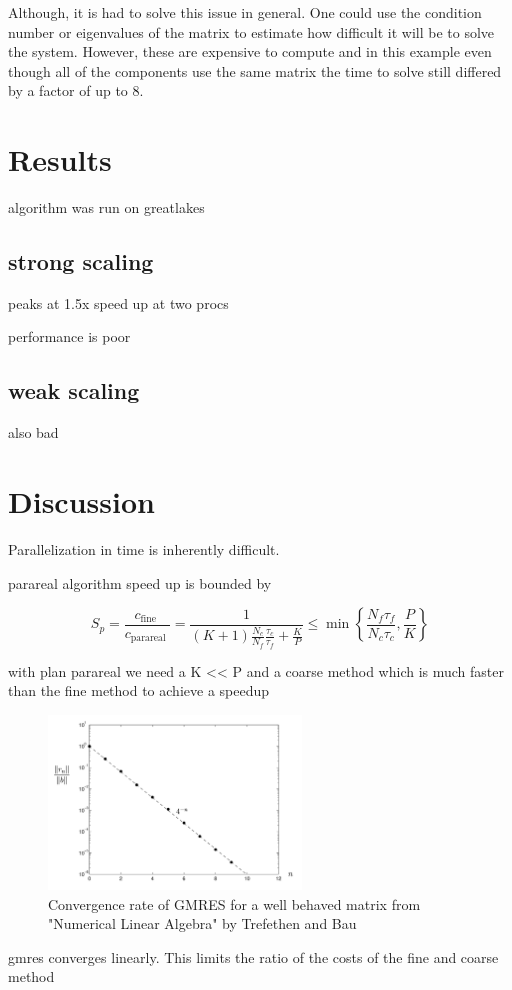 \documentclass[conf]{new-aiaa}
\begin{document}
Although, it is had to solve this issue in general.
One could use the condition number or eigenvalues of the matrix to estimate how difficult it will be to solve the system.
However, these are expensive to compute and in this example even though all of the components use the same matrix the time to solve still differed by a factor of up to 8.

\section{Results}
algorithm was run on greatlakes

\subsection{strong scaling}
peaks at 1.5x speed up at two procs

performance is poor

\subsection{weak scaling}

also bad

\section{Discussion}

Parallelization in time is inherently difficult.

parareal algorithm speed up is bounded by


\begin{equation}
    S_{p}=\frac{c_{\text {fine }}}{c_{\text {parareal }}}=\frac{1}{(K+1) \frac{N_{c}}{N_{f}} \frac{\tau_{c}}{\tau_{f}}+\frac{K}{P}} \leq \min \left\{\frac{N_{f} \tau_{f}}{N_{c} \tau_{c}}, \frac{P}{K}\right\}
\end{equation}

with plan parareal we need a K << P and a coarse method which is much faster than the fine method to achieve a speedup

\begin{figure}[H]
	\centering
	\includegraphics[width=0.60\textwidth,keepaspectratio]{gmres_conv.png}
	\caption{Convergence rate of GMRES for a well behaved matrix from "Numerical Linear Algebra" by Trefethen and Bau}
	\label{fig:gmres_conv}
\end{figure}
gmres converges linearly. This limits the ratio of the costs of the fine and coarse method
\end{document}
